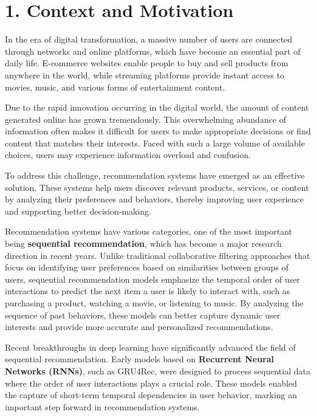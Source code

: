 \documentclass[12pt,a4paper]{report}
\begin{document}
\section*{1. Context and Motivation}

In the era of digital transformation, a massive number of users are connected
through networks and online platforms, which have become an essential part of
daily life. E-commerce websites enable people to buy and sell products from
anywhere in the world, while streaming platforms provide instant access to
movies, music, and various forms of entertainment content.

Due to the rapid innovation occurring in the digital world, the amount of
content generated online has grown tremendously. This overwhelming abundance of
information often makes it difficult for users to make appropriate decisions or
find content that matches their interests. Faced with such a large volume of
available choices, users may experience information overload and confusion.

To address this challenge, recommendation systems have emerged as an effective
solution. These systems help users discover relevant products, services, or
content by analyzing their preferences and behaviors, thereby improving user
experience and supporting better decision-making.

Recommendation systems have various categories, one of the most important being
\textbf{sequential recommendation}, which has become a major research direction
in recent years. Unlike traditional collaborative filtering approaches that focus
on identifying user preferences based on similarities between groups of users,
sequential recommendation models emphasize the temporal order of user interactions
to predict the next item a user is likely to interact with, such as purchasing a
product, watching a movie, or listening to music. By analyzing the sequence of
past behaviors, these models can better capture dynamic user interests and provide
more accurate and personalized recommendations.

Recent breakthroughs in deep learning have significantly advanced the field of
sequential recommendation. Early models based on \textbf{Recurrent Neural Networks
(RNNs)}, such as GRU4Rec, were designed to process sequential data where the order
of user interactions plays a crucial role. These models enabled the capture of
short-term temporal dependencies in user behavior, marking an important step forward
in recommendation systems.
\end{document}
